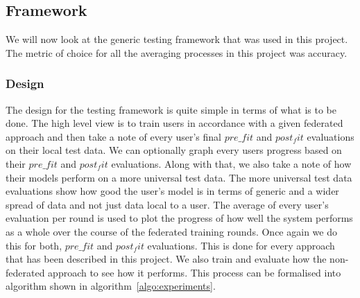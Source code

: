\documentclass[12pt]{article}
\begin{document}
\subsection{Framework}\label{subsec:framework}
We will now look at the generic testing framework that was used in this project. The metric of choice for all the averaging processes in this project was accuracy. 
\subsubsection{Design}
The design for the testing framework is quite simple in terms of what is to be done. The high level view is to train users in accordance with a given federated approach and then take a note of every user's final $pre\_fit$ and $post_fit$ evaluations on their local test data. We can optionally graph every users progress based on their $pre\_fit$ and $post_fit$ evaluations. Along with that, we also take a note of how their models perform on a more universal test data. The more universal test data evaluations show how good the user's model is in terms of generic and a wider spread of data and not just data local to a user. The average of every user's evaluation per round is used to plot the progress of how well the system performs as a whole over the course of the federated training rounds. Once again we do this for both, $pre\_fit$ and $post_fit$ evaluations. This is done for every approach that has been described in this project. We also train and evaluate how the non-federated approach to see how it performs. This process can be formalised into algorithm shown in algorithm~\ref{algo:experiments}.
\end{document}
